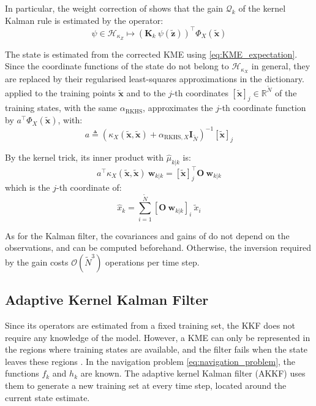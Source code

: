 In particular, the weight correction of  shows that the gain $\mathcal{Q}_k$ of the kernel Kalman rule is estimated by the operator:
\begin{equation}
	\psi\in\mathcal{H}_{\kappa_Z}\mapsto\left(\mathbf{K}_k\:\psi(\tilde{\mathbf{z}})\right)^\top\Phi_X(\tilde{\mathbf{x}})
\end{equation}

The state is estimated from the corrected KME using \eqref{eq:KME_expectation}. Since the coordinate functions of the state do not belong to $\mathcal{H}_{\kappa_X}$ in general, they are replaced by their regularised least-squares approximations in the dictionary.  applied to the training points $\tilde{\mathbf{x}}$ and to the $j$-th coordinates $[\tilde{\mathbf{x}}]_j\in\mathbb{R}^{\tilde{N}}$ of the training states, with the same $\alpha_{\mathrm{RKHS}}$, approximates the $j$-th coordinate function by $a^\top\Phi_X(\tilde{\mathbf{x}})$, with:
\begin{equation}
	a\triangleq\left(\kappa_X(\tilde{\mathbf{x}},\tilde{\mathbf{x}})+\alpha_{\mathrm{RKHS},X}\mathbf{I}_{\tilde{N}}\right)^{-1}[\tilde{\mathbf{x}}]_j
\end{equation}

By the kernel trick, its inner product with $\hat{\mu}_{k|k}$ is:
\begin{equation}
	a^\top \kappa_X(\tilde{\mathbf{x}},\tilde{\mathbf{x}})\:\mathbf{w}_{k|k}=[\tilde{\mathbf{x}}]_j^\top \mathbf{O}\:\mathbf{w}_{k|k}
\end{equation}
which is the $j$-th coordinate of:
\begin{equation}
	\hat{x}_k=\sum_{i=1}^{\tilde{N}}\left[\mathbf{O}\:\mathbf{w}_{k|k}\right]_i\:\tilde{x}_i\label{eq:KKF_estimate}
\end{equation}

\begin{remark}
	As for the Kalman filter, the covariances and gains of  do not depend on the observations, and can be computed beforehand. Otherwise, the inversion required by the gain costs $\mathcal{O}\left(\tilde{N}^3\right)$ operations per time step.
\end{remark}

\subsection{Adaptive Kernel Kalman Filter}

Since its operators are estimated from a fixed training set, the KKF does not require any knowledge of the model. However, a KME can only be represented in the regions where training states are available, and the filter fails when the state leaves these regions \cite{bib:AKKF}. In the navigation problem \eqref{eq:navigation_problem}, the functions $f_k$ and $h_k$ are known. The adaptive kernel Kalman filter (AKKF) uses them to generate a new training set at every time step, located around the current state estimate.

